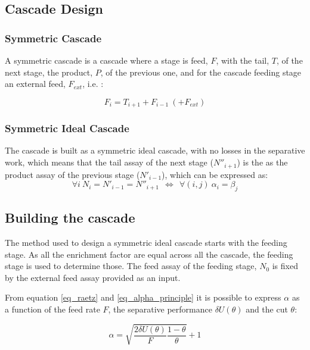 \subsection{Cascade Design}
\subsubsection{Symmetric Cascade}

A symmetric cascade is a cascade where a stage is feed, $F$, with the tail, $T$, of the next
stage, the product, $P$, of the previous one, and for the cascade feeding stage
an external feed, $F_{ext}$, i.e. :

\begin{equation}
    F_{i} = T_{i+1} + F_{i-1} ~(+ F_{ext})
\end{equation}

\subsubsection{Symmetric Ideal Cascade}
The cascade is built as a symmetric ideal cascade, with no losses in the
separative work, which means that the tail assay of the next stage ($N''_{i+1}$)
is the as the product assay of the previous stage ($N'_{i-1}$), which can be
expressed as:
\begin{equation}
    \forall i~ N_{i} = N'_{i-1} = N''_{i+1}~ ~\Leftrightarrow~ ~\forall (i,j)~
    \alpha_{i} = \beta_{j}
\end{equation}



\subsection{Building the cascade}

The method used to design a symmetric ideal cascade starts with the feeding
stage. As all the enrichment factor are equal across all the cascade, the
feeding stage is used to determine those.
The feed assay of the feeding stage, $N_{0}$ is fixed by the external feed assay
provided as an input.

From equation \eqref{eq_raetz} and \eqref{eq_alpha_principle} it is possible to
express $\alpha$ as a function of the feed rate $F$, the separative performance
$\delta U(\theta)$ and the cut $\theta$:

\begin{equation} \label{eq_alpha}
    \alpha = \sqrt{\frac{2\delta U(\theta)}{F} \frac{1-\theta}{\theta}} + 1
\end{equation}


